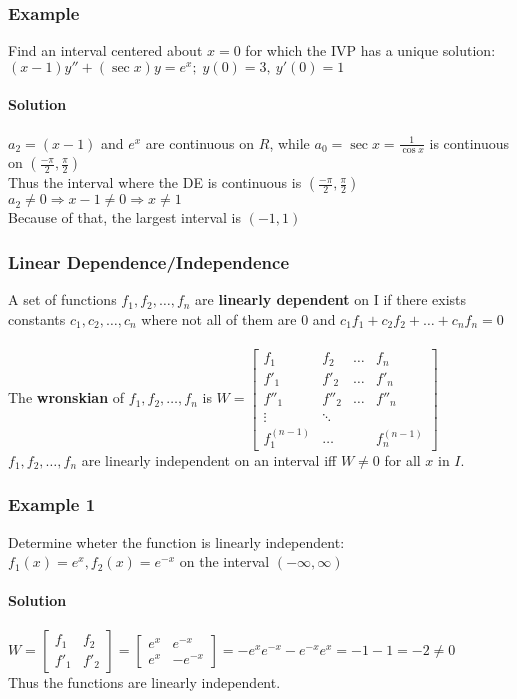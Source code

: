 \documentclass{article}
\begin{document}
\newpage\subsubsection{Example}
Find an interval centered about $x=0$ for which the IVP has a unique solution: $(x-1)y''+(\sec x)y=e^x;\;y(0)=3,\:y'(0)=1$

\paragraph{Solution} $a_2=(x-1)$ and $e^x$ are continuous on $R$, while $a_0=\sec x=\frac{1}{\cos x}$ is continuous on $(\frac{-\pi}{2},\frac{\pi}{2})$
\\Thus the interval where the DE is continuous is $(\frac{-\pi}{2},\frac{\pi}{2})$
\\$a_2\neq0\Rightarrow x-1\neq0\Rightarrow x\neq1$
\\Because of that, the largest interval is $(-1,1)$

\subsubsection{Linear Dependence/Independence}
A set of functions $f_1,f_2,\dots,f_n$ are \textbf{linearly dependent} on I if there exists constants
$c_1,c_2,\dots,c_n$ where not all of them are 0 and $c_1f_1+c_2f_2+\dots+c_nf_n=0$
\\\\The \textbf{wronskian} of $f_1,f_2,\dots,f_n$ is $W=\begin{bmatrix}
    f_1 & f_2 & \dots & f_n \\
    f'_1 & f'_2 & \dots & f'_n \\
    f''_1 & f''_2 & \dots & f''_n \\
    \vdots & \ddots \\
    f^{(n-1)}_1 & \dots && f^{(n-1)}_n
\end{bmatrix}$
\\$f_1,f_2,\dots,f_n$ are linearly independent on an interval iff $W\neq0$ for all $x$ in $I$.

\subsubsection{Example 1} Determine wheter the function is linearly independent: $f_1(x)=e^x,f_2(x)=e^{-x}$ on the interval $(-\infty,\infty)$
\paragraph{Solution} $W=\begin{bmatrix}
    f_1 & f_2 \\
    f'_1 & f'_2
\end{bmatrix}=\begin{bmatrix}
    e^x & e^{-x} \\
    e^x & -e^{-x}
\end{bmatrix}=-e^xe^{-x}-e^{-x}e^x=-1-1=-2\neq0$
\\Thus the functions are linearly independent.
\end{document}
